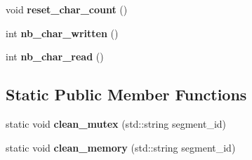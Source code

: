 \begin{DoxyCompactItemize}
\item 
void {\bfseries reset\+\_\+char\+\_\+count} ()\hypertarget{classshared__memory_1_1internal_1_1Exchange__manager__memory_a871ca7c6476c78d1887e271b3f2bea62}{}\label{classshared__memory_1_1internal_1_1Exchange__manager__memory_a871ca7c6476c78d1887e271b3f2bea62}

\item 
int {\bfseries nb\+\_\+char\+\_\+written} ()\hypertarget{classshared__memory_1_1internal_1_1Exchange__manager__memory_ad30f6606b230c0fe4b4d3ec73da96a6c}{}\label{classshared__memory_1_1internal_1_1Exchange__manager__memory_ad30f6606b230c0fe4b4d3ec73da96a6c}

\item 
int {\bfseries nb\+\_\+char\+\_\+read} ()\hypertarget{classshared__memory_1_1internal_1_1Exchange__manager__memory_a76284109b7af9a05bf763154ba36391e}{}\label{classshared__memory_1_1internal_1_1Exchange__manager__memory_a76284109b7af9a05bf763154ba36391e}

\end{DoxyCompactItemize}
\subsection*{Static Public Member Functions}
\begin{DoxyCompactItemize}
\item 
static void {\bfseries clean\+\_\+mutex} (std\+::string segment\+\_\+id)\hypertarget{classshared__memory_1_1internal_1_1Exchange__manager__memory_a080eaca6885c4760620fd1df11907b66}{}\label{classshared__memory_1_1internal_1_1Exchange__manager__memory_a080eaca6885c4760620fd1df11907b66}

\item 
static void {\bfseries clean\+\_\+memory} (std\+::string segment\+\_\+id)\hypertarget{classshared__memory_1_1internal_1_1Exchange__manager__memory_ab87f3b0b0511bebd1f084ca088044e5f}{}\label{classshared__memory_1_1internal_1_1Exchange__manager__memory_ab87f3b0b0511bebd1f084ca088044e5f}

\end{DoxyCompactItemize}
